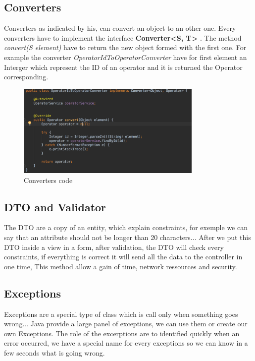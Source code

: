 \subsection{Converters}

Converters as indicated by his, can convert an object to an other one. Every converters have to implement the interface  \textbf{Converter<S, T>} . The method \textit{convert(S element)} have to return the new object formed with the first one. For example the converter \textit{OperatorIdToOperatorConverter} have for first element an Interger which represent the ID of an operator and it is returned the Operator corresponding. 

\begin{figure}[H]
  \caption{Converters code}
  \centering
    \includegraphics[width=0.8\textwidth]{img/converter.png}
\end{figure}



\subsection{DTO and Validator}

The DTO are a copy of an entity, which explain constraints, for exemple we can say that an attribute should not be longer than 20 characters...
After we put this DTO inside a view in a form, after validation, the DTO will check every constraints, if everything is correct it will send all the data to the controller in one time,
This method allow a gain of time, network ressources and security.

\subsection{Exceptions}

Exceptions are a special type of class which is call only when something goes wrong...
Java provide a large panel of exceptions, we can use them or create our own Exceptions.
The role of the excerptions are to identified quickly when an error occurred, we have a special name for every exceptions so we can know in a few seconds what is going wrong.



